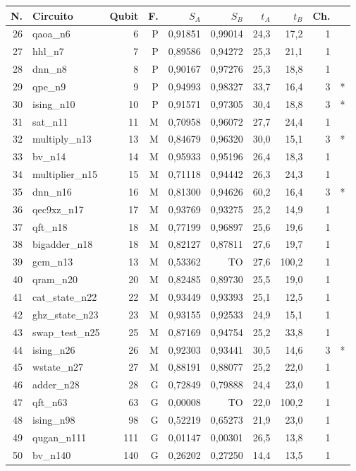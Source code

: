 \documentclass[11pt,a4paper]{article}
\begin{document}
\begin{center}
\setlength{\tabcolsep}{5pt}
\begin{tabular}{rlrrrrrrrr}
\toprule
N. & Circuito & Qubit & F. & $S_A$ & $S_B$ & $t_A$ & $t_B$ & Ch. & \\
\midrule
26 & qaoa\_n6 & 6 & P & 0,91851 & 0,99014 & 24,3 & 17,2 & 1 & \\
27 & hhl\_n7 & 7 & P & 0,89586 & 0,94272 & 25,3 & 21,1 & 1 & \\
28 & dnn\_n8 & 8 & P & 0,90167 & 0,97276 & 25,3 & 18,8 & 1 & \\
29 & qpe\_n9 & 9 & P & 0,94993 & 0,98327 & 33,7 & 16,4 & 3 & *\\
30 & ising\_n10 & 10 & P & 0,91571 & 0,97305 & 30,4 & 18,8 & 3 & *\\
31 & sat\_n11 & 11 & M & 0,70958 & 0,96072 & 27,7 & 24,4 & 1 & \\
32 & multiply\_n13 & 13 & M & 0,84679 & 0,96320 & 30,0 & 15,1 & 3 & *\\
33 & bv\_n14 & 14 & M & 0,95933 & 0,95196 & 26,4 & 18,3 & 1 & \\
34 & multiplier\_n15 & 15 & M & 0,71118 & 0,94442 & 26,3 & 24,3 & 1 & \\
35 & dnn\_n16 & 16 & M & 0,81300 & 0,94626 & 60,2 & 16,4 & 3 & *\\
36 & qec9xz\_n17 & 17 & M & 0,93769 & 0,93275 & 25,2 & 14,9 & 1 & \\
37 & qft\_n18 & 18 & M & 0,77199 & 0,96897 & 25,6 & 19,6 & 1 & \\
38 & bigadder\_n18 & 18 & M & 0,82127 & 0,87811 & 27,6 & 19,7 & 1 & \\
39 & gcm\_n13 & 13 & M & 0,53362 & TO & 27,6 & 100,2 & 1 & \\
40 & qram\_n20 & 20 & M & 0,82485 & 0,89730 & 25,5 & 19,0 & 1 & \\
41 & cat\_state\_n22 & 22 & M & 0,93449 & 0,93393 & 25,1 & 12,5 & 1 & \\
42 & ghz\_state\_n23 & 23 & M & 0,93155 & 0,92533 & 24,9 & 15,1 & 1 & \\
43 & swap\_test\_n25 & 25 & M & 0,87169 & 0,94754 & 25,2 & 33,8 & 1 & \\
44 & ising\_n26 & 26 & M & 0,92303 & 0,93441 & 30,5 & 14,6 & 3 & *\\
45 & wstate\_n27 & 27 & M & 0,88191 & 0,88077 & 25,2 & 22,0 & 1 & \\
46 & adder\_n28 & 28 & G & 0,72849 & 0,79888 & 24,4 & 23,0 & 1 & \\
47 & qft\_n63 & 63 & G & 0,00008 & TO & 22,0 & 100,2 & 1 & \\
48 & ising\_n98 & 98 & G & 0,52219 & 0,65273 & 21,9 & 23,0 & 1 & \\
49 & qugan\_n111 & 111 & G & 0,01147 & 0,00301 & 26,5 & 13,8 & 1 & \\
50 & bv\_n140 & 140 & G & 0,26202 & 0,27250 & 14,4 & 13,5 & 1 & \\
\bottomrule
\end{tabular}\end{center}
\end{document}
